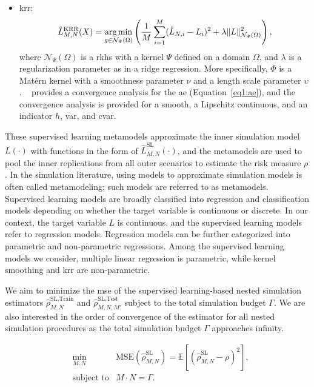 \begin{itemize}
    \item   \gls{krr}:
            $$\hat{L}^{\text{KRR}}_{M, N}(X) = \operatorname*{arg\,min}_{g \in \mathcal{N}_{\Psi}(\Omega)} \left( \frac{1}{M} \sum_{i=1}^M (\hat{L}_{N, i} - L_i)^2 + \lambda \|L\|_{\mathcal{N}_{\Psi}(\Omega)}^2\right),$$
            where $\mathcal{N}_{\Psi}(\Omega)$ is a \gls{rkhs} with a kernel $\Psi$ defined on a domain $\Omega$, and $\lambda$ is a regularization parameter as in a ridge regression. 
            More specifically, $\Phi$ is a Mat\'ern kernel with a smoothness parameter $\nu$ and a length scale parameter $\upsilon$.
            ~\cite{wang2022smooth} provides a convergence analysis for the \gls{ae} (Equation~\eqref{eq1:ae}), and the convergence analysis is provided for a smooth, a Lipschitz continuous, and an indicator $h$, \gls{var}, and \gls{cvar}.
\end{itemize}

These supervised learning metamodels approximate the inner simulation model $L(\cdot)$ with functions in the form of $\hat{L}^{\text{SL}}_{M, N}(\cdot)$, and the metamodels are used to pool the inner replications from all outer scenarios to estimate the risk measure $\rho$.
In the simulation literature, using models to approximate simulation models is often called metamodeling; such models are referred to as metamodels.
Supervised learning models are broadly classified into regression and classification models depending on whether the target variable is continuous or discrete.
In our context, the target variable $L$ is continuous, and the supervised learning models refer to regression models.
Regression models can be further categorized into parametric and non-parametric regressions.
Among the supervised learning models we consider, multiple linear regression is parametric, while kernel smoothing and \gls{krr} are non-parametric.

We aim to minimize the \gls{mse} of the supervised learning-based nested simulation estimators $\hat{\rho}^{\text{SL}, \text{Train}}_{M, N}$ and $\hat{\rho}^{\text{SL}, \text{Test}}_{M, N, M'}$ subject to the total simulation budget $\Gamma$.
We are also interested in the order of convergence of the estimator for all nested simulation procedures as the total simulation budget $\Gamma$ approaches infinity.

\begin{align}
    & \min_{M, N}  & \text{MSE}(\hat{\rho}^{\text{SL}}_{M, N}) = \mathbb{E} \left[ \left( \hat{\rho}^{\text{SL}}_{M, N} - \rho \right)^2 \right], \nonumber \\
    & \text{subject to} & M \cdot N = \Gamma.
\end{align}

